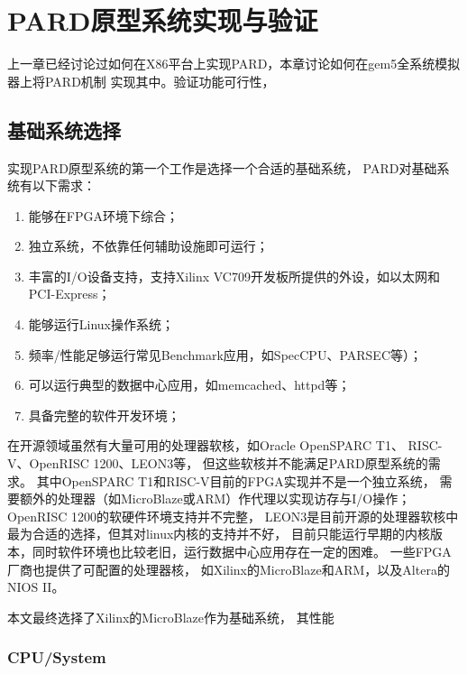 

\chapter{PARD原型系统实现与验证}
\label{chap:impl}

上一章已经讨论过如何在X86平台上实现PARD，本章讨论如何在gem5全系统模拟器上将PARD机制
实现其中。验证功能可行性，


\section{基础系统选择}

实现PARD原型系统的第一个工作是选择一个合适的基础系统，
PARD对基础系统有以下需求：

\begin{enumerate}
  \item 能够在FPGA环境下综合；
  \item 独立系统，不依靠任何辅助设施即可运行；
  \item 丰富的I/O设备支持，支持Xilinx VC709开发板所提供的外设，如以太网和PCI-Express；
  \item 能够运行Linux操作系统；
  \item 频率/性能足够运行常见Benchmark应用，如SpecCPU、PARSEC等）；
  \item 可以运行典型的数据中心应用，如memcached、httpd等；
  \item 具备完整的软件开发环境；
\end{enumerate}

在开源领域虽然有大量可用的处理器软核，如Oracle OpenSPARC T1\cite{sparct1}、
RISC-V\cite{riscv}、OpenRISC 1200\cite{or1200}、LEON3\cite{leon3}等，
但这些软核并不能满足PARD原型系统的需求。
其中OpenSPARC T1和RISC-V目前的FPGA实现并不是一个独立系统，
需要额外的处理器（如MicroBlaze或ARM）作代理以实现访存与I/O操作；
OpenRISC 1200的软硬件环境支持并不完整，
LEON3是目前开源的处理器软核中最为合适的选择，但其对linux内核的支持并不好，
目前只能运行早期的内核版本，同时软件环境也比较老旧，运行数据中心应用存在一定的困难。
一些FPGA厂商也提供了可配置的处理器核，
如Xilinx的MicroBlaze\cite{microblaze}和ARM\cite{zynq}，以及Altera的NIOS II\cite{niosii}。

本文最终选择了Xilinx的MicroBlaze作为基础系统，
其性能





\subsection{CPU/System}
